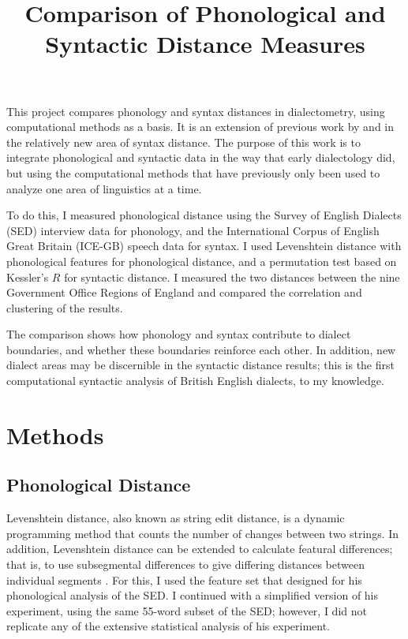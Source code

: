 \documentclass[11pt,letterpaper]{article}
\begin{document}
\title{Comparison of Phonological and Syntactic Distance Measures}

\maketitle

This project compares phonology and syntax distances in dialectometry,
using computational methods as a basis. It is an extension of
previous work by \cite{nerbonne06} and
\cite{sanders07} in the relatively new area of syntax
distance. The purpose of this work is to integrate phonological and
syntactic data in the way that early dialectology did, but using the
computational methods that have previously only been used to analyze
one area of linguistics at a time.

To do this, I measured phonological distance using the Survey of
English Dialects (SED) \cite{orton63} interview data for phonology,
and the International Corpus of English Great Britain (ICE-GB) \cite{nelson02} speech
data for syntax. I used Levenshtein distance \cite{lev65} with
phonological features \cite{nerbonne97} for phonological distance, and
a permutation test based on Kessler's $R$ \cite{kessler01} for
syntactic distance. I measured the two distances between
the nine Government Office Regions of England and compared the
correlation and clustering of the results.

The comparison shows how phonology and syntax contribute to dialect
boundaries, and whether these boundaries reinforce each other. In
addition, new dialect areas may be discernible in the syntactic
distance results; this is the first computational syntactic
analysis of British English dialects, to my knowledge.

\section{Methods}
\subsection{Phonological Distance}
Levenshtein distance, also known as string edit distance, is a dynamic
programming method that counts the number of changes between two
strings. In addition, Levenshtein distance can be extended to
calculate featural differences; that is, to use subsegmental
differences to give differing distances between individual segments
\cite{heeringa04}. For this, I used the feature set that
 designed for his phonological analysis of the
SED. I continued with a simplified version of his experiment, using
the same 55-word subset of the SED; however, I did not replicate any of
the extensive statistical analysis of his experiment.
\end{document}
